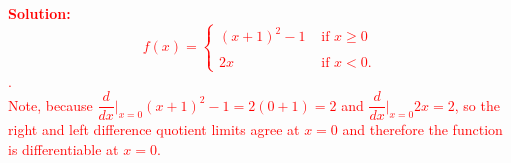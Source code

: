 \documentclass[letterpaper,11pt]{article}
\newcommand{\sol}[2]{\begin{minipage}[c][#1]{\linewidth}{\textcolor{red}{\textbf{Solution:}}\quad \textcolor{red}{#2}}\end{minipage}}
\newcommand{\sol}[2]{\begin{minipage}[c][#1]{\linewidth}{\vfill}\end{minipage}}
\begin{document}
\begin{enumerate}
\sol{1.5 in}{
\begin{displaymath}
  f(x) = \left\{
     \begin{array}{ll}
      (x+1)^2-1 & \mbox{ if } x\ge0 \\ \\
      2x & \mbox{ if } x<0.
     \end{array}
   \right.
\end{displaymath}.
\\
Note, because $\dfrac{d}{dx} \bigg|_{x=0} (x+1)^2-1=2(0+1)=2$ and $\dfrac{d}{dx} \bigg|_{x=0} 2x=2$, so 
the right and left difference quotient limits agree at $x=0$ and therefore the function is differentiable at $x=0$.
}

\end{enumerate}
\end{document}
